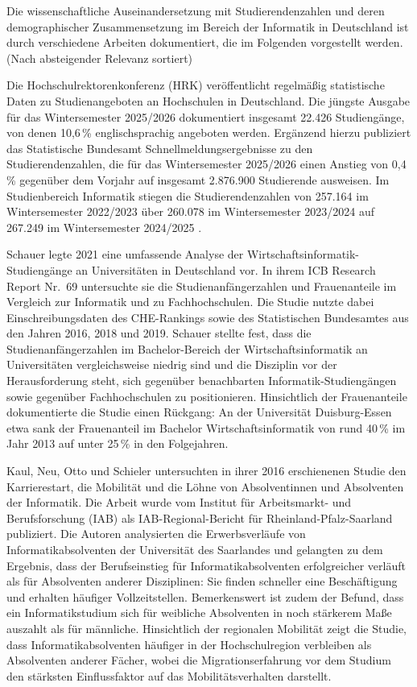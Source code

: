 Die wissenschaftliche Auseinandersetzung mit Studierendenzahlen und deren demographischer Zusammensetzung im Bereich der Informatik in Deutschland ist durch verschiedene Arbeiten dokumentiert, die im Folgenden vorgestellt werden. (Nach absteigender Relevanz sortiert)

Die Hochschulrektorenkonferenz (HRK) \cite{hrkStatistik2025} veröffentlicht regelmäßig statistische Daten zu Studienangeboten an Hochschulen in Deutschland. Die jüngste Ausgabe für das Wintersemester 2025/2026 dokumentiert insgesamt 22.426 Studiengänge, von denen 10,6\,\% englischsprachig angeboten werden. Ergänzend hierzu publiziert das Statistische Bundesamt \cite{destatisWS2025} Schnellmeldungsergebnisse zu den Studierendenzahlen, die für das Wintersemester 2025/2026 einen Anstieg von 0,4\,\% gegenüber dem Vorjahr auf insgesamt 2.876.900 Studierende ausweisen. Im Studienbereich Informatik stiegen die Studierendenzahlen von 257.164 im Wintersemester 2022/2023 über 260.078 im Wintersemester 2023/2024 auf 267.249 im Wintersemester 2024/2025 \cite{destatisStudierende2025}.

Schauer \cite{schauerWirtschaftsinformatik2021} legte 2021 eine umfassende Analyse der Wirtschaftsinformatik-Studiengänge an Universitäten in Deutschland vor. In ihrem ICB Research Report Nr.~69 untersuchte sie die Studienanfängerzahlen und Frauenanteile im Vergleich zur Informatik und zu Fachhochschulen. Die Studie nutzte dabei Einschreibungsdaten des CHE-Rankings sowie des Statistischen Bundesamtes aus den Jahren 2016, 2018 und 2019. Schauer stellte fest, dass die Studienanfängerzahlen im Bachelor-Bereich der Wirtschaftsinformatik an Universitäten vergleichsweise niedrig sind und die Disziplin vor der Herausforderung steht, sich gegenüber benachbarten Informatik-Studiengängen sowie gegenüber Fachhochschulen zu positionieren. Hinsichtlich der Frauenanteile dokumentierte die Studie einen Rückgang: An der Universität Duisburg-Essen etwa sank der Frauenanteil im Bachelor Wirtschaftsinformatik von rund 40\,\% im Jahr 2013 auf unter 25\,\% in den Folgejahren.

Kaul, Neu, Otto und Schieler \cite{kaulKarrierestart2016} untersuchten in ihrer 2016 erschienenen Studie den Karrierestart, die Mobilität und die Löhne von Absolventinnen und Absolventen der Informatik. Die Arbeit wurde vom Institut für Arbeitsmarkt- und Berufsforschung (IAB) als IAB-Regional-Bericht für Rheinland-Pfalz-Saarland publiziert. Die Autoren analysierten die Erwerbsverläufe von Informatikabsolventen der Universität des Saarlandes und gelangten zu dem Ergebnis, dass der Berufseinstieg für Informatikabsolventen erfolgreicher verläuft als für Absolventen anderer Disziplinen: Sie finden schneller eine Beschäftigung und erhalten häufiger Vollzeitstellen. Bemerkenswert ist zudem der Befund, dass ein Informatikstudium sich für weibliche Absolventen in noch stärkerem Maße auszahlt als für männliche. Hinsichtlich der regionalen Mobilität zeigt die Studie, dass Informatikabsolventen häufiger in der Hochschulregion verbleiben als Absolventen anderer Fächer, wobei die Migrationserfahrung vor dem Studium den stärksten Einflussfaktor auf das Mobilitätsverhalten darstellt.

